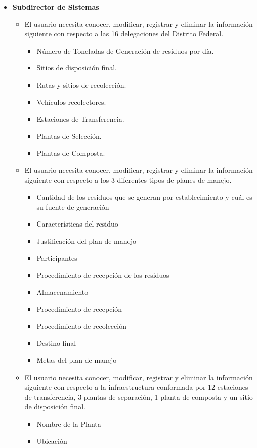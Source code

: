\begin{itemize}
	\item \textbf{Subdirector de Sistemas}
	\begin{itemize}
		\item El usuario necesita conocer, modificar, registrar y eliminar la información siguiente con respecto a las 16  delegaciones del Distrito Federal.
		\begin{itemize}
			\item Número de Toneladas de Generación de residuos por día.
			\item Sitios de disposición final.
			\item Rutas y sitios de recolección.
			\item Vehículos recolectores.
			\item Estaciones de Transferencia.
			\item Plantas de Selección.
			\item Plantas de Composta.
		\end{itemize}
		\item El usuario necesita conocer, modificar, registrar y eliminar la información siguiente con respecto a los 3 diferentes tipos de planes de manejo.
		\begin{itemize}
			\item Cantidad de los residuos que se generan  por establecimiento y cuál es su fuente de generación
			\item Características del residuo
			\item Justificación del plan de manejo        
			\item Participantes
			\item Procedimiento de recepción  de los residuos
			\item Almacenamiento
			\item Procedimiento de recepción    
			\item Procedimiento de  recolección
			\item Destino final
			\item Metas del plan de manejo
		\end{itemize}
		\item El usuario necesita conocer, modificar, registrar y eliminar la información siguiente con respecto a la infraestructura conformada por 12 estaciones de transferencia, 3 plantas de separación, 1 planta de composta y un sitio de disposición final.
		\begin{itemize}
			\item Nombre de la Planta
			\item Ubicación

\end{itemize}
\end{itemize}
\end{itemize}
